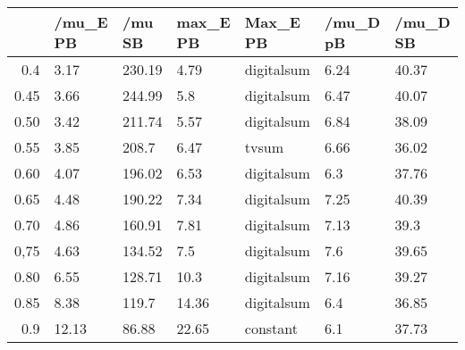 \begin{table}[ht]
\centering
\begin{tabular}{rllllll}
  \hline
 & /mu\_E PB & /mu SB & max\_E PB & Max\_E PB & /mu\_D pB & /mu\_D SB \\ 
  \hline
0.4 & 3.17 & 230.19 & 4.79 & digitalsum & 6.24 & 40.37 \\ 
  0.45 & 3.66 & 244.99 & 5.8 & digitalsum & 6.47 & 40.07 \\ 
  0.50 & 3.42 & 211.74 & 5.57 & digitalsum & 6.84 & 38.09 \\ 
  0.55 & 3.85 & 208.7 & 6.47 & tvsum & 6.66 & 36.02 \\ 
  0.60 & 4.07 & 196.02 & 6.53 & digitalsum & 6.3 & 37.76 \\ 
  0.65 & 4.48 & 190.22 & 7.34 & digitalsum & 7.25 & 40.39 \\ 
  0.70 & 4.86 & 160.91 & 7.81 & digitalsum & 7.13 & 39.3 \\ 
  0,75 & 4.63 & 134.52 & 7.5 & digitalsum & 7.6 & 39.65 \\ 
  0.80 & 6.55 & 128.71 & 10.3 & digitalsum & 7.16 & 39.27 \\ 
  0.85 & 8.38 & 119.7 & 14.36 & digitalsum & 6.4 & 36.85 \\ 
  0.9 & 12.13 & 86.88 & 22.65 & constant & 6.1 & 37.73 \\ 
   \hline
\end{tabular}
\end{table}
